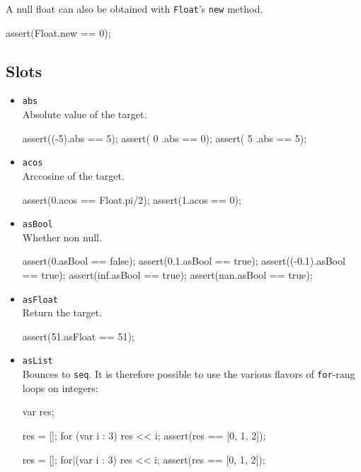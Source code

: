 A null float can also be obtained with \lstinline|Float|'s
\lstinline|new| method.

\begin{urbiscript}[firstnumber=last]
assert(Float.new == 0);
\end{urbiscript}

\subsection{Slots}

\begin{itemize}
\item \lstinline|abs|\\
  Absolute value of the target.
\begin{urbiscript}[firstnumber=last]
assert((-5).abs == 5);
assert(  0 .abs == 0);
assert(  5 .abs == 5);
\end{urbiscript}

\item \lstinline|acos|\\
  Arccosine of the target.
\begin{urbiscript}[firstnumber=last]
assert(0.acos == Float.pi/2);
assert(1.acos == 0);
\end{urbiscript}

\item \lstinline|asBool|\\
  Whether non null.
\begin{urbiscript}[firstnumber=last]
assert(0.asBool == false);
assert(0.1.asBool == true);
assert((-0.1).asBool == true);
assert(inf.asBool == true);
assert(nan.asBool == true);
\end{urbiscript}

\item \lstinline|asFloat|\\
  Return the target.
\begin{urbiscript}[firstnumber=last]
assert(51.asFloat == 51);
\end{urbiscript}

\item \lstinline|asList|\\
  Bounces to \lstinline|seq|.  It is therefore possible to use the
  various flavors of \lstinline|for|-rang loops on integers:
\begin{urbiscript}[firstnumber=last]
{
  var res;

  res = [];
  for (var i : 3)
    res << i;
  assert(res == [0, 1, 2]);

  res = [];
  for|(var i : 3)
    res << i;
  assert(res == [0, 1, 2]);

}
\end{urbiscript}
\end{itemize}
